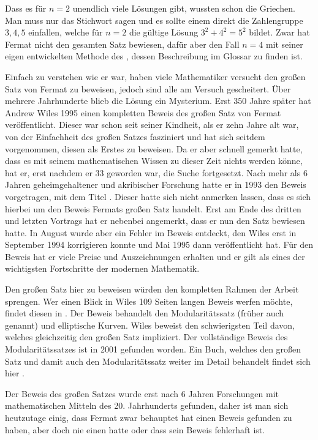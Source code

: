 Dass es für $n = 2$ unendlich viele Lösungen gibt, wussten schon die Griechen. Man muss nur das Stichwort  sagen und es sollte einem direkt die Zahlengruppe $3,4,5$ einfallen, welche für $n = 2$ die gültige Lösung $3^2 + 4^2 = 5^2$ bildet. Zwar hat Fermat nicht den gesamten Satz bewiesen, dafür aber den Fall $n = 4$ mit seiner eigen entwickelten Methode des , dessen Beschreibung im Glossar zu finden ist.

Einfach zu verstehen wie er war, haben viele Mathematiker versucht den großen Satz von Fermat zu beweisen, jedoch sind alle am Versuch gescheitert. Über mehrere Jahrhunderte blieb die Lösung ein Mysterium. Erst 350 Jahre später hat Andrew Wiles 1995 einen kompletten Beweis des großen Satz von Fermat veröffentlicht. Dieser war schon seit seiner Kindheit, als er zehn Jahre alt war, von der Einfachheit des großen Satzes fasziniert und hat sich seitdem vorgenommen, diesen als Erstes zu beweisen. Da er aber schnell gemerkt hatte, dass es mit seinem mathematischen Wissen zu dieser Zeit nichts werden könne, hat er, erst nachdem er 33 geworden war, die Suche fortgesetzt. Nach mehr als 6 Jahren geheimgehaltener und akribischer Forschung hatte er in 1993 den Beweis vorgetragen, mit dem Titel . Dieser hatte sich nicht anmerken lassen, dass es sich hierbei um den Beweis Fermats großen Satz handelt. Erst am Ende des dritten und letzten Vortrags hat er nebenbei angemerkt, dass er nun den Satz bewiesen hatte. \cite{newYorkTimes} In August wurde aber ein Fehler im Beweis entdeckt, den Wiles erst in September 1994 korrigieren konnte und Mai 1995 dann veröffentlicht hat. Für den Beweis hat er viele Preise und Auszeichnungen erhalten und er gilt als eines der wichtigsten Fortschritte der modernen Mathematik.

Den großen Satz hier zu beweisen würden den kompletten Rahmen der Arbeit sprengen. Wer einen Blick in Wiles 109 Seiten langen Beweis werfen möchte, findet diesen in \cite{wilesFermat}. Der Beweis behandelt den Modularitätssatz (früher auch  genannt) und elliptische Kurven. Wiles beweist den schwierigsten Teil davon, welches gleichzeitig den großen Satz impliziert. Der vollständige Beweis des Modularitätssatzes ist in 2001 gefunden worden. Ein Buch, welches den großen Satz und damit auch den Modularitätssatz weiter im Detail behandelt findet sich hier \cite{darmon}.

Der Beweis des großen Satzes wurde erst nach 6 Jahren Forschungen mit mathematischen Mitteln des 20. Jahrhunderts gefunden, daher ist man sich heutzutage einig, dass Fermat zwar behauptet hat einen Beweis gefunden zu haben, aber doch nie einen hatte oder dass sein Beweis fehlerhaft ist.
